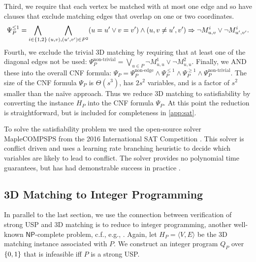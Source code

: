 \documentclass[11pt]{article}
\renewcommand\NP{\ensuremath{\mathsf{NP}}}
\begin{document}
Third, we require that each vertex be matched with at most one edge and so have clauses that exclude matching edges that
overlap on one or two coordinates.
\begin{equation}
  \Psi_P^{\le 1} = \bigwedge_{i \in \left\{ 1,2 \right\}} \bigwedge_{(u,v),
    (u',v') \in P^2} (u = u' \vee v = v') \wedge (u,v \neq u',v')
  \Rightarrow \neg M_{u,v}^i \vee \neg M_{u',v'}^i.
\end{equation}
Fourth, we exclude the trivial 3D matching by requiring that at least
one of the diagonal edges not be used:
  $\Psi_P^{\text{non-trivial}} = \bigvee_{u \in P} \neg M_{u,u}^1 \vee
  \neg M_{u,u}^2.$
Finally, we AND these into the overall CNF formula:
  $\Psi_P = \Psi_P^{\text{non-edge}} \wedge \Psi_P^{\le 1} \wedge
  \Psi_P^{\ge 1} \wedge \Psi_P^{\text{non-trivial}}.$
The size of the CNF formula $\Psi_P$ is $\Theta(s^3)$, has $2s^2$
variables, and is a factor of $s^2$ smaller than the na\"{i}ve
approach.  Thus we reduce 3D matching to satisfiability by converting the
instance $H_P$ into the CNF formula $\Psi_P$.  At this point the
reduction is straightforward, but is included for completeness in
\autoref{app:sat}.

To solve the satisfiability problem %
we used the open-source solver MapleCOMPSPS from the 2016
International SAT Competition \cite{bhj17}.  This solver is
conflict driven and uses a learning rate branching heuristic to decide
which variables are likely to lead to conflict.  The solver provides
no polynomial time guarantees, but has had
demonstrable success in practice \cite{lgpc16}.

\subsection{3D Matching to Integer Programming}

In parallel to the last section, we use the connection between verification of strong
USP and 3D matching is to reduce to integer
programming, another well-known \NP{}-complete problem, c.f., e.g., \cite{kv12}.
Again, let $H_P = \langle V, E \rangle$ be the 3D matching instance
associated with $P$.  We construct an integer program $Q_P$ over $\left\{ 0,1 \right\}$ that is infeasible iff $P$ is a strong USP.
\end{document}
